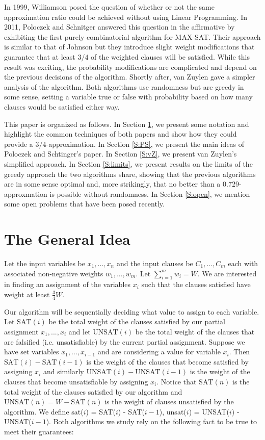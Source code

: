 \documentclass[11pt,letter]{article}
\numberwithin{theorem}{section}
\begin{document}
In 1999, Williamson posed the question
of whether or not the same approximation ratio could be achieved without using Linear Programming. In 2011,
Poloczek and Schnitger \cite{Poloczek:2011:RVJ:2133036.2133087} answered this question in the affirmative
by exhibiting the first purely combinatorial algorithm for MAX-SAT. Their approach is similar to that of Johnson
but they introduce slight weight modifications that guarantee that at least $3/4$ of the weighted clauses will be satisfied.
While this result was exciting, the probability modifications are complicated and depend on the previous decisions
of the algorithm. Shortly after, van Zuylen \cite{vanZuylen:2011:SAM:2238496.2238512} gave a simpler analysis of the algorithm.
Both algorithms use randomness but are greedy in some sense,
setting a variable true or false with probability based on
how many clauses would be satisfied either way.

This paper is organized as follows.
In Section \ref{S:idea}, we present some notation and highlight the common techniques of both papers
and show how they could provide a $3/4$-approximation.
In Section \ref{S:PS}, we present the main ideas of Poloczek and Schtinger's paper.
In Section \ref{S:vZ}, we present van Zuylen's simplified approach.
In Section \ref{S:limits}, we present results on the limits of
the greedy approach the two algorithms share,
showing that the previous algorithms are in some sense optimal
and, more strikingly,
that no better than a $0.729$-approxmation is possible without randomness.
In Section \ref{S:open}, we mention some open problems that have been posed recently.


\section{The General Idea}\label{S:idea}

Let the input variables be $x_1,...,x_n$ and the input clauses be $C_1,...,C_m$
each with associated non-negative weights $w_1,...,w_m$. Let $\sum_{i=1}^{m} w_i = W$.
We are interested in finding an assignment of the variables $x_i$ such that the clauses satisfied have weight at least $\frac{3}{4}W$.

Our algorithm will be sequentially deciding what value to assign to each variable. Let $\mathrm{SAT}(i)$ be the total weight of the clauses
satisfied by our partial assignment $x_1, ..., x_i$ and let $\mathrm{UNSAT}(i)$ be the total weight of the clauses that are falsified (i.e. unsatisfiable) by the current partial assignment.
Suppose we have set variables $x_1,...,x_{i-1}$ and are considering a value for variable $x_i$. Then $\mathrm{SAT}(i)-\mathrm{SAT}(i-1)$ is the weight
of the clauses that become satisfied by assigning $x_i$ and similarly $\mathrm{UNSAT}(i) - \mathrm{UNSAT}(i-1)$ is the weight of the clauses that become
unsatisfiable by assigning $x_i$.
Notice that $\mathrm{SAT}(n)$ is the total weight of the clauses satisfied by our algorithm and $\mathrm{UNSAT}(n) = W - \mathrm{SAT}(n)$ is the weight of clauses
unsatisfied by the algorithm. We define sat($i$) = SAT($i$) - SAT($i-1$), unsat($i$) = UNSAT($i$) - UNSAT($i-1$). Both algorithms we study rely on the following fact to be true to meet their guarantees:
\end{document}
